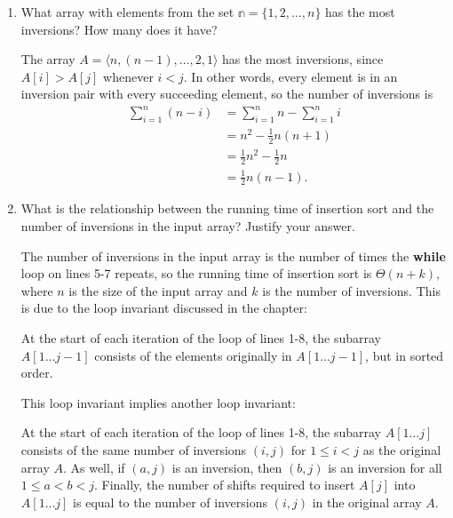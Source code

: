 \documentclass[Chapter02]{subfiles}
\begin{document}
\begin{enumerate}[leftmargin=\labelsep,label={\textbf{\thesection-\arabic*}}]
\begin{enumerate}
			\item What array with elements from the set $\mathbb{n} = \{1, 2, \dots, n\}$ has the most inversions? How many does it have?
			\begin{answer}
				The array $A = \langle n, (n - 1), \dots, 2, 1 \rangle$ has the most inversions, since $A[i] > A[j]$ whenever $i < j$. In other words, every element is in an inversion pair with every succeeding element, so the number of inversions is
				\begin{align*}
					\sum_{i = 1}^n (n - i) &= \sum_{i = 1}^n n - \sum_{i = 1}^n i\\
						&= n^2 - \frac{1}{2}n(n + 1)\\
						&= \frac{1}{2}n^2 - \frac{1}{2}n\\
						&= \frac{1}{2}n(n - 1).
				\end{align*}
			\end{answer}
			
			\item What is the relationship between the running time of insertion sort and the number of inversions in the input array? Justify your answer.
			\begin{answer}
				The number of inversions in the input array is the number of times the \textbf{while} loop on lines 5-7 repeats, so the running time of insertion sort is $\Theta(n + k)$, where $n$ is the size of the input array and $k$ is the number of inversions. This is due to the loop invariant discussed in the chapter:
				\begin{addmargin}[2em]{2em}
					At the start of each iteration of the  loop of lines 1-8, the subarray $A[1 \dots j-1]$ consists of the elements originally in $A[1 \dots j-1]$, but in sorted order.
				\end{addmargin}

				This loop invariant implies another loop invariant:
				\begin{addmargin}[2em]{2em}
					At the start of each iteration of the  loop of lines 1-8, the subarray $A[1 \dots j]$ consists of the same number of inversions $(i,j)$ for $1 \leq i < j$ as the original array $A$. As well, if $(a,j)$ is an inversion, then $(b,j)$ is an inversion for all $1 \leq a < b < j$. Finally, the number of shifts required to insert $A[j]$ into $A[1 \dots j]$ is equal to the number of inversions $(i,j)$ in the original array $A$.
				\end{addmargin}


\end{answer}
\end{enumerate}
\end{enumerate}
\end{document}
